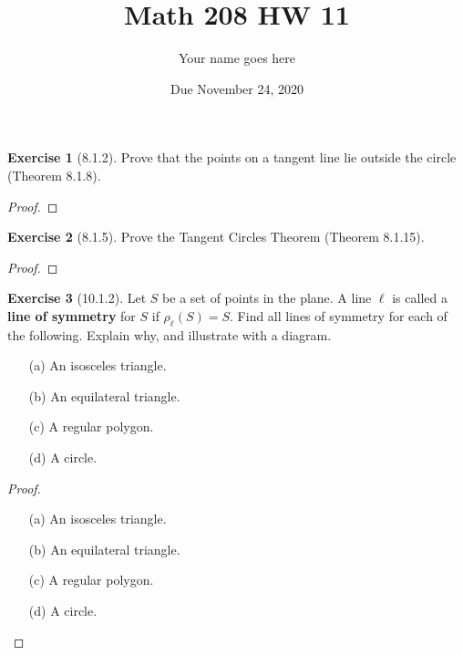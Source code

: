 \documentclass[11pt]{article}		%
\title{Math 208 HW 11}
\author{Your name goes here}  %
\date{Due November 24, 2020}
\theoremstyle{definition}
\newtheorem*{ex}{Exercise}
\begin{document}
	\maketitle
	
	

\begin{ex}[8.1.2]
Prove that the points on a tangent line lie outside the circle  (Theorem 8.1.8).
	
\end{ex}

\begin{proof} 
	
\end{proof}


\vspace{1in} %




\begin{ex}[8.1.5]
	Prove the Tangent Circles Theorem (Theorem 8.1.15).
	
\end{ex}

\begin{proof} 
	
\end{proof}


\vspace{1in} %





\begin{ex}[10.1.2]
	Let $S$ be a set of points in the plane.  A line $\ell$ is called a \textbf{line of symmetry} for $S$ if $\rho_\ell(S) = S$.  Find all lines of symmetry for each of the following.  Explain why, and illustrate with a diagram.
	\begin{enumerate}
		\item[(a)] An isosceles triangle.
		\item[(b)] An equilateral triangle.
		\item[(c)] A regular polygon.
		\item[(d)] A circle.
	\end{enumerate}
	\vspace{.1in}
\end{ex}

\begin{proof}
	$\,$
	
	\begin{enumerate}
		\item[(a)] An isosceles triangle.

		\item[(b)] An equilateral triangle.
		
		\item[(c)] A regular polygon.
		
		\item[(d)] A circle.
	\end{enumerate}
	
\end{proof}
\end{document}
